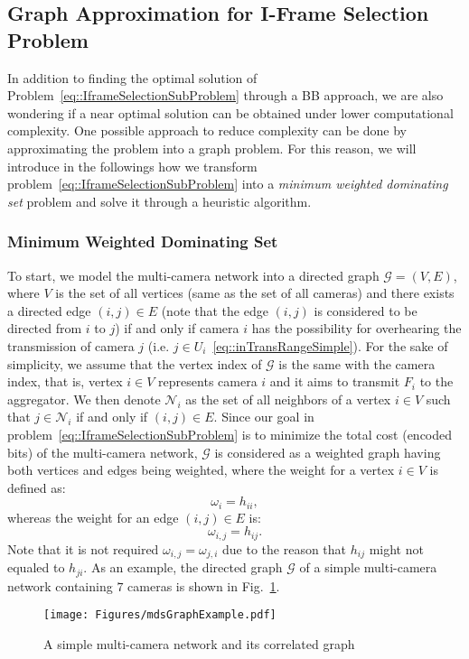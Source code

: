 \subsection{Graph Approximation for I-Frame Selection Problem}
\label{sec::graphApprox}
In addition to finding the optimal solution of Problem~\eqref{eq::IframeSelectionSubProblem} through a BB approach, we are also wondering if a near optimal solution can be obtained under lower computational complexity.
One possible approach to reduce complexity can be done by approximating the problem into a graph problem.
For this reason, we will introduce in the followings how we transform problem~\eqref{eq::IframeSelectionSubProblem} into a \emph{minimum weighted dominating set} problem and solve it through a heuristic algorithm.
%
\subsubsection{Minimum Weighted Dominating Set}
To start, we model the multi-camera network into a directed graph $\mathcal{G}=(V,E)$, where $V$ is the set of all vertices (same as the set of all cameras) and there exists a directed edge $(i,j) \in E$ (note that the edge $(i,j)$ is considered to be directed from $i$ to $j$) if and only if camera $i$ has the possibility for overhearing the transmission of camera $j$ (i.e. $j \in U_i$~\eqref{eq::inTransRangeSimple}).
For the sake of simplicity, we assume that the vertex index of $\mathcal{G}$ is the same with the camera index, that is, vertex $i \in V$ represents camera $i$ and it aims to transmit $F_i$ to the aggregator.
We then denote $\mathcal{N}_i$ as the set of all neighbors of a vertex $i \in V$ such that $j \in \mathcal{N}_i$ if and only if $(i,j) \in E$.
Since our goal in problem~\eqref{eq::IframeSelectionSubProblem} is to minimize the total cost (encoded bits) of the multi-camera network, $\mathcal{G}$ is considered as a weighted graph having both vertices and edges being weighted, where the weight for a vertex $i \in V$ is defined as:
\begin{equation}
\omega_i = h_{ii},
\end{equation}
whereas the weight for an edge $(i,j) \in E$ is:
\begin{equation}
\omega_{i,j} = h_{ij}.
\end{equation}
Note that it is not required $\omega_{i,j} = \omega_{j,i}$ due to the reason that $h_{ij}$ might not equaled to $h_{ji}$.
As an example, the directed graph $\mathcal{G}$ of a simple multi-camera network containing $7$ cameras is shown in Fig.~\ref{fig::mdsGraphExample}.
%
\begin{figure}
\begin{center}
\texttt{[image: Figures/mdsGraphExample.pdf]}
\caption{\label{fig::mdsGraphExample}A simple multi-camera network and its correlated graph}
\end{center}
\end{figure}
%

